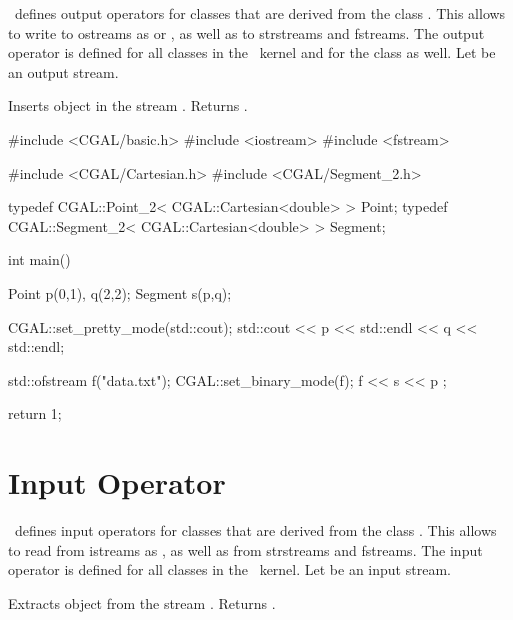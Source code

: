 \cgal\  defines output operators for classes that are derived
from the class . This allows to write to ostreams
as  or , as well as to strstreams
and fstreams.
The output operator is defined for all classes in the \cgal\ kernel and for the class  as well.
Let   be an output stream.

{Inserts object  in the stream . Returns .}


\ccExample

\begin{ccExampleCode}

#include <CGAL/basic.h>
#include <iostream>
#include <fstream>

#include <CGAL/Cartesian.h>
#include <CGAL/Segment_2.h>

typedef CGAL::Point_2< CGAL::Cartesian<double> >     Point;
typedef CGAL::Segment_2< CGAL::Cartesian<double> >   Segment;

int main()
{
    Point p(0,1), q(2,2);
    Segment s(p,q);

    CGAL::set_pretty_mode(std::cout);
    std::cout << p << std::endl << q  << std::endl;

    std::ofstream f("data.txt");
    CGAL::set_binary_mode(f);
    f << s << p ;

    return 1;
}
\end{ccExampleCode}


\section{Input Operator}


\cgal\  defines input operators for classes that are derived
from the class . This allows to read from istreams
as , as well as from strstreams and fstreams.
The input operator is defined for all classes in the \cgal\ kernel.
Let  be an input stream.

   {Extracts object  from the stream . Returns .}


\ccExample

